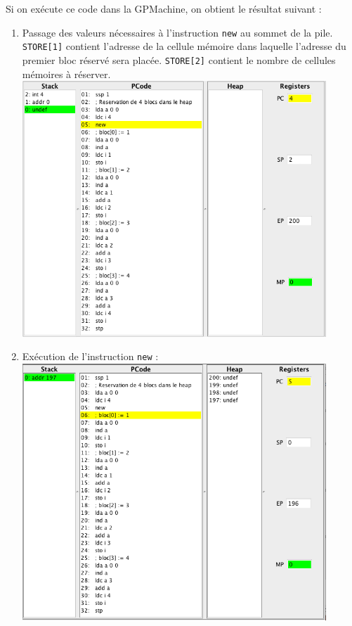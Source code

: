 \documentclass[french,11pt,twoside]{article}
\begin{document}
Si on exécute ce code dans la GPMachine, on obtient le résultat suivant :
\begin{enumerate}
\item Passage des valeurs nécessaires à l'instruction \texttt{new} au sommet de la pile. \texttt{STORE[1]} contient l'adresse de la cellule mémoire dans laquelle l'adresse du premier bloc réservé sera placée. \texttt{STORE[2]} contient le nombre de cellules mémoires à réserver.  \\
            \includegraphics[width=0.9\textwidth]{images/exemple-heap-0}
\item Exécution de l'instruction \texttt{new} : \\
            \includegraphics[width=0.9\textwidth]{images/exemple-heap-1}

\end{enumerate}
\end{document}
